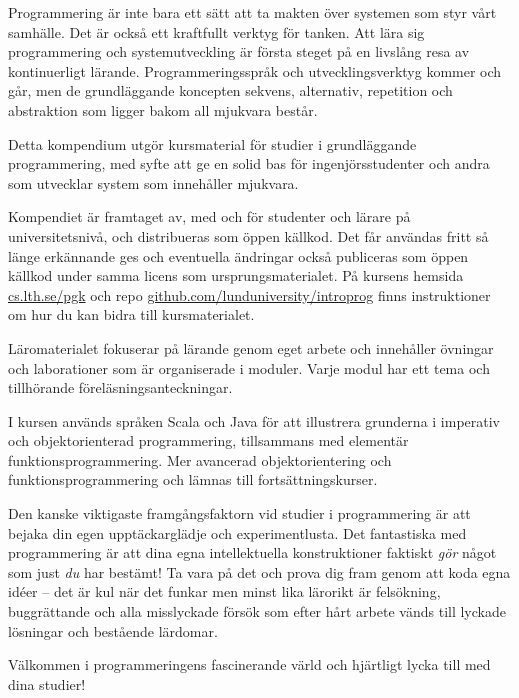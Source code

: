 


Programmering är inte bara ett sätt att ta makten över systemen som styr vårt samhälle. Det är också ett kraftfullt verktyg för tanken. Att lära sig programmering och systemutveckling är första steget på en livslång resa av kontinuerligt lärande. Programmeringsspråk och utvecklingsverktyg kommer och går, men de grundläggande koncepten sekvens, alternativ, repetition och abstraktion som ligger bakom all mjukvara består. 

Detta kompendium utgör kursmaterial för studier i grundläggande programmering, med syfte att ge en solid bas för ingenjörsstudenter och andra som utvecklar system som innehåller mjukvara. 

Kompendiet är framtaget av, med och för studenter och lärare på universitetsnivå, och distribueras som öppen källkod. Det får användas fritt så länge erkännande ges och eventuella ändringar också publiceras som öppen källkod under samma licens som ursprungsmaterialet. På kursens hemsida \href{http://cs.lth.se/pgk}{cs.lth.se/pgk} och repo \href{http://github.com/lunduniversity/introprog}{github.com/lunduniversity/introprog} finns instruktioner om hur du kan bidra till kursmaterialet.

Läromaterialet fokuserar på lärande genom eget arbete och innehåller övningar och laborationer som är organiserade i moduler. Varje modul har ett tema och tillhörande föreläsningsanteckningar.

I kursen används språken Scala och Java för att illustrera grunderna i imperativ och objektorienterad programmering, tillsammans med elementär funktionsprogrammering. Mer avancerad objektorientering och funktionsprogrammering och  lämnas till fortsättningskurser. 



Den kanske viktigaste framgångsfaktorn vid studier i programmering är att bejaka din egen upptäckarglädje och experimentlusta. Det fantastiska med programmering är att dina egna intellektuella konstruktioner faktiskt \emph{gör} något som just \emph{du} har bestämt! Ta vara på det och prova dig fram genom att koda egna idéer -- det är kul när det funkar men minst lika lärorikt är felsökning, buggrättande och alla misslyckade försök som efter hårt arbete vänds till lyckade lösningar och bestående lärdomar. 

Välkommen i programmeringens fascinerande värld och hjärtligt lycka till med dina studier!


